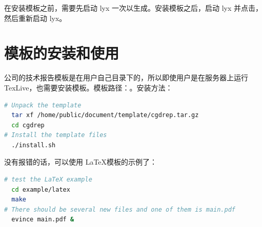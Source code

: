 在安装模板之前，需要先启动 lyx 一次以生成。安装模板之后，启动 lyx 并点击，然后重新启动 lyx。

\section{模板的安装和使用}
公司的技术报告模板是在用户自己目录下的，所以即使用户是在服务器上运行 TexLive，也需要安装模板。模板路径：。安装方法：
\begin{lstlisting}[language=sh,caption={安装模板}]
# Unpack the template
  tar xf /home/public/document/template/cgdrep.tar.gz
  cd cgdrep
# Install the template files
  ./install.sh
\end{lstlisting}

没有报错的话，可以使用 \LaTeX 模板的示例了：
\begin{lstlisting}[language=sh,caption={模板示例}]
# test the LaTeX example
  cd example/latex
  make
# There should be several new files and one of them is main.pdf
  evince main.pdf &
\end{lstlisting}
